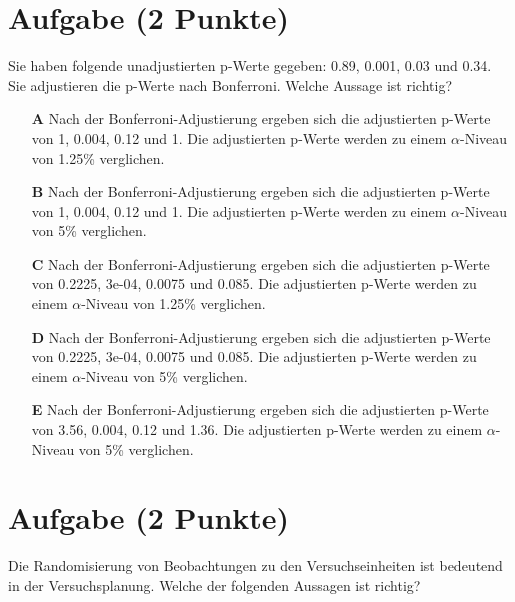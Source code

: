 \documentclass[a4paper, 9pt]{scrartcl}\usepackage[]{graphicx}\usepackage[]{xcolor}
\begin{document}
\section{Aufgabe \hfill (2 Punkte)}



Sie haben folgende unadjustierten p-Werte gegeben: 0.89, 0.001, 0.03 und 0.34. Sie adjustieren die p-Werte nach
Bonferroni. Welche Aussage ist richtig?



\begin{enumerate}
\item [\textbf{A} \msquare] Nach der Bonferroni-Adjustierung ergeben sich die adjustierten p-Werte von 1, 0.004, 0.12 und 1. Die adjustierten p-Werte werden zu einem $\alpha$-Niveau von 1.25\% verglichen.
\item [\textbf{B} \msquare] Nach der Bonferroni-Adjustierung ergeben sich die adjustierten p-Werte von 1, 0.004, 0.12 und 1. Die adjustierten p-Werte werden zu einem $\alpha$-Niveau von 5\% verglichen.
\item [\textbf{C} \msquare] Nach der Bonferroni-Adjustierung ergeben sich die adjustierten p-Werte von 0.2225, 3e-04, 0.0075 und 0.085. Die adjustierten p-Werte werden zu einem $\alpha$-Niveau von 1.25\% verglichen.
\item [\textbf{D} \msquare] Nach der Bonferroni-Adjustierung ergeben sich die adjustierten p-Werte von 0.2225, 3e-04, 0.0075 und 0.085. Die adjustierten p-Werte werden zu einem $\alpha$-Niveau von 5\% verglichen.
\item [\textbf{E} \msquare] Nach der Bonferroni-Adjustierung ergeben sich die adjustierten p-Werte von 3.56, 0.004, 0.12 und 1.36. Die adjustierten p-Werte werden zu einem $\alpha$-Niveau von 5\% verglichen.
\end{enumerate} 

\section{Aufgabe \hfill (2 Punkte)}

Die Randomisierung von Beobachtungen zu den Versuchseinheiten
ist bedeutend in der Versuchsplanung. Welche der folgenden Aussagen ist richtig?
\end{document}
